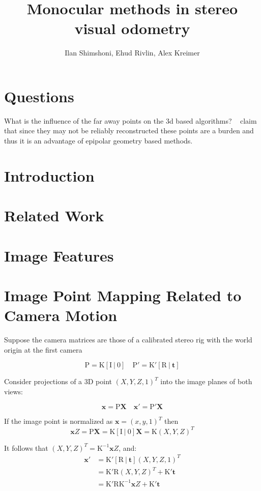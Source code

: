 \documentclass[10pt]{article}         %
\title{Monocular methods in stereo visual odometry}
\author{Ilan Shimshoni, Ehud Rivlin, Alex Kreimer}
\begin{document}
\maketitle


\section{Questions}
What is the influence of the far away points on the 3d based
algorithms?  ~\cite{tardif2008monocular} claim that since they may not
be reliably reconstructed these points are a burden and thus it is an
advantage of epipolar geometry based methods.

\section{Introduction}

\section{Related Work}

\section{Image Features}

\section{Image Point Mapping Related to Camera Motion}

Suppose the camera matrices are those of a calibrated stereo rig with
the world origin at the first camera

\[
\mathrm{P = K[I\ |\ 0]\quad P'=K'[R\ |\ \mathbf{t}]}
\]

Consider projections of a 3D point $(X,Y,Z,1)^T$ into the image planes of both views:

\[
\mathrm{\mathbf{x} = P\mathbf{X} \quad \mathbf{x}' = P'\mathbf{X}}
\]

If the image point is normalized as $\mathbf{x} = (x,y,1)^T$ then
\[
\mathbf{x}Z = \mathrm{P\mathbf{X} = K[I\ |\ 0]\mathbf{X} = K}(X,Y,Z)^T
\]

It follows that $(X,Y,Z)^T = \mathrm{K^{-1}}\mathbf{x}Z$, and:
\begin{align*}
  \mathbf{x}' &= \mathrm{K'[R\ |\ \mathbf{t}]}(X,Y,Z,1)^T \\
  &= \mathrm{K'R}(X,Y,Z)^T + \mathrm{K'\mathbf{t}}\\
  &= \mathrm{K'RK^{-1}}\mathbf{x}Z + \mathrm{K'\mathbf{t}}\\
\end{align*}
\end{document}
